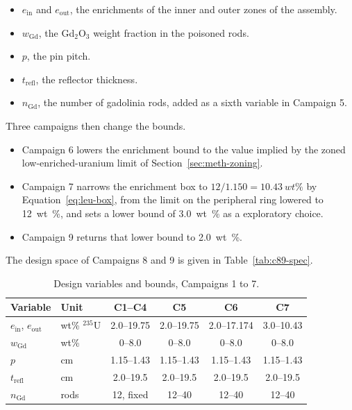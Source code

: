 \begin{itemize}
  \item $e_\mathrm{in}$ and $e_\mathrm{out}$, the enrichments of the
        inner and outer zones of the assembly.

  \item $w_\mathrm{Gd}$, the Gd$_2$O$_3$ weight fraction in the
        poisoned rods.

  \item $p$, the pin pitch.

  \item $t_\mathrm{refl}$, the reflector thickness.

  \item $n_\mathrm{Gd}$, the number of gadolinia rods, added as a sixth
        variable in Campaign 5.
\end{itemize}

Three campaigns then change the bounds.

\begin{itemize}
  \item Campaign 6 lowers the enrichment bound to the value implied by
        the zoned low-enriched-uranium limit of
        Section~\ref{sec:meth-zoning}.

  \item Campaign 7 narrows the enrichment box to
        $12/1.150 = \SI{10.43}{wt\%}$ by Equation~\eqref{eq:leu-box},
        from the limit on the peripheral ring lowered to
        \SI{12}{wt\%}, and sets a lower bound of \SI{3.0}{wt\%} as a
        exploratory choice.

  \item Campaign 9 returns that lower bound to \SI{2.0}{wt\%}.
\end{itemize}

The design space of Campaigns 8 and 9 is given in
Table~\ref{tab:c89-spec}.

\begin{table}[htbp]
  \centering
  \small
  \caption{Design variables and bounds, Campaigns 1 to 7.}
  \label{tab:design-space}\label{tab:design-space-c56}\label{tab:design-space-c78}
  \begin{tabular}{@{}llcccc@{}}
    \toprule
    Variable & Unit & C1--C4 & C5 & C6 & C7 \\
    \midrule
    $e_\mathrm{in}$, $e_\mathrm{out}$ & wt\% $^{235}$U & 2.0--19.75 & 2.0--19.75 & 2.0--17.174 & 3.0--10.43 \\
    $w_\mathrm{Gd}$ & wt\% & 0--8.0 & 0--8.0 & 0--8.0 & 0--8.0 \\
    $p$ & cm & 1.15--1.43 & 1.15--1.43 & 1.15--1.43 & 1.15--1.43 \\
    $t_\mathrm{refl}$ & cm & 2.0--19.5 & 2.0--19.5 & 2.0--19.5 & 2.0--19.5 \\
    $n_\mathrm{Gd}$ & rods & 12, fixed & 12--40 & 12--40 & 12--40 \\
    \bottomrule
  \end{tabular}
\end{table}

